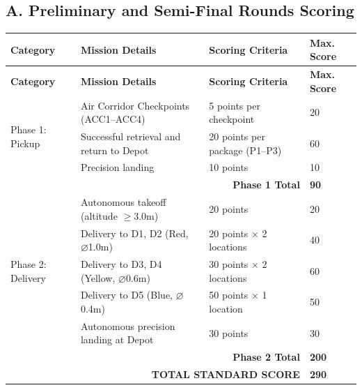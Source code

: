 \documentclass[12pt,a4paper]{article}
\begin{document}
\subsection*{A. Preliminary and Semi-Final Rounds Scoring}
\begin{longtable}{p{3.0cm}p{6.0cm}p{3.8cm}p{1.6cm}}
\toprule
\textbf{Category} & \textbf{Mission Details} & \textbf{Scoring Criteria} & \textbf{Max. Score} \\
\midrule
\endfirsthead
\toprule
\textbf{Category} & \textbf{Mission Details} & \textbf{Scoring Criteria} & \textbf{Max. Score} \\
\midrule
\endhead
\multirow{3}{3.0cm}{Phase 1: Pickup} & Air Corridor Checkpoints (ACC1–ACC4) & 5 points per checkpoint & 20 \\
 & Successful retrieval and return to Depot & 20 points per package (P1–P3) & 60 \\
 & Precision landing & 10 points & 10 \\
\midrule
\multicolumn{3}{r}{\textbf{Phase 1 Total}} & \textbf{90} \\
\midrule
\multirow{5}{3.0cm}{Phase 2: Delivery} & Autonomous takeoff (altitude $\geq 3.0$m) & 20 points & 20 \\
 & Delivery to D1, D2 (Red, $\varnothing$1.0m) & 20 points $\times$ 2 locations & 40 \\
 & Delivery to D3, D4 (Yellow, $\varnothing$0.6m) & 30 points $\times$ 2 locations & 60 \\
 & Delivery to D5 (Blue, $\varnothing$0.4m) & 50 points $\times$ 1 location & 50 \\
 & Autonomous precision landing at Depot & 30 points & 30 \\
\midrule
\multicolumn{3}{r}{\textbf{Phase 2 Total}} & \textbf{200} \\
\midrule
\multicolumn{3}{r}{\textbf{TOTAL STANDARD SCORE}} & \textbf{290} \\
\bottomrule
\end{longtable}
\end{document}
